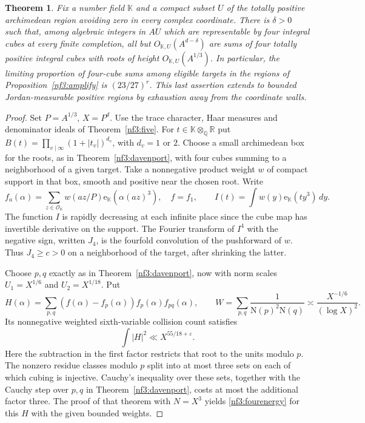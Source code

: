 \documentclass[11pt,letterpaper]{article}
\newtheorem{theorem}{Theorem}[section]
\theoremstyle{definition}
\numberwithin{equation}{section}
\begin{document}
\begin{theorem}\label{nf3:four}
Fix a number field $\mathbb K$ and a compact subset $U$ of the totally
positive archimedean region avoiding zero in every complex coordinate.
There is $\delta>0$ such that, among algebraic integers in $A U$ which are
representable by four integral cubes at every finite completion, all but
$O_{\mathbb K,U}(A^{d-\delta})$ are sums of four totally positive integral
cubes with roots of height $O_{\mathbb K,U}(A^{1/3})$.
In particular, the limiting proportion of four-cube sums among eligible
targets in the regions of Proposition~\ref{nf3:amplify} is $(23/27)^r$.
This last assertion extends to bounded Jordan-measurable positive regions
by exhaustion away from the coordinate walls.
\end{theorem}

\begin{proof}
Set $P=A^{1/3}$, $X=P^d$. Use the trace character, Haar measures and
denominator ideals of Theorem~\ref{nf3:five}. For
$t\in \mathbb K\otimes_{\mathbb Q}\mathbb R$ put
$B(t)=\prod_{v\mid\infty}(1+|t_v|)^{d_v}$, with $d_v=1$ or $2$.
Choose a small archimedean box for the roots, as in
Theorem~\ref{nf3:davenport}, with four cubes summing to a neighborhood
of a given target. Take a nonnegative product weight $w$ of compact
support in that box, smooth and positive near the chosen root. Write
\[
 f_a(\alpha)=\sum_{z\in\mathcal O_{\mathbb K}}w(az/P)
                \mathrm e_{\mathbb K}(\alpha (az)^3),\quad f=f_1,
 \qquad I(t)=\int w(y)\mathrm e_{\mathbb K}(ty^3)\,dy .
\]
The function $I$ is rapidly decreasing at each infinite place since
the cube map has invertible derivative on the support. The Fourier
transform of $I^4$ with the negative sign, written $J_4$, is the
fourfold convolution of the pushforward of $w$. Thus $J_4\ge c>0$ on
a neighborhood of the target, after shrinking the latter.

Choose $p,q$ exactly as in Theorem~\ref{nf3:davenport}, now with
norm scales $U_1=X^{1/6}$ and $U_2=X^{1/18}$. Put
\[
 H(\alpha)=\sum_{p,q}(f(\alpha)-f_p(\alpha))f_p(\alpha)f_{pq}(\alpha),
 \qquad
 W=\sum_{p,q}\frac{1}{\mathrm N(p)^2\mathrm N(q)}
 \asymp \frac{X^{-1/6}}{(\log X)^2}.
\]
Its nonnegative weighted sixth-variable collision count satisfies
\begin{equation}\label{nf3:fourenergy}
                   \int |H|^2\ll X^{55/18+\varepsilon}.
\end{equation}
Here the subtraction in the first factor restricts that root to the units
modulo $p$. The nonzero residue classes modulo $p$ split into at
most three sets on each of which cubing is injective. Cauchy's inequality
over these sets, together with the Cauchy step over $p,q$ in
Theorem~\ref{nf3:davenport}, costs at most the additional factor three.
The proof of that theorem with $N=X^3$ yields \eqref{nf3:fourenergy} for this $H$ with
the given bounded weights.


\end{proof}
\end{document}
